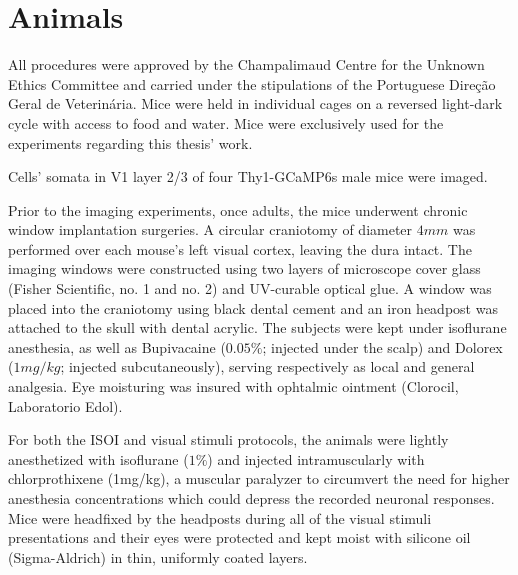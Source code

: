 \section{Animals}
\label{sec:Animals}

All procedures were approved by the Champalimaud Centre for the Unknown Ethics Committee and carried under the stipulations of the Portuguese Direção Geral de Veterinária. Mice were held in individual cages on a reversed light-dark cycle with access to food and water. Mice were exclusively used for the experiments regarding this thesis' work.

Cells' somata in V1 layer 2/3 of four Thy1-GCaMP6s male mice were imaged.

Prior to the imaging experiments, once adults, the mice underwent chronic window implantation surgeries. A circular craniotomy of diameter $4mm$ was performed over each mouse's left visual cortex, leaving the dura intact. The imaging windows were constructed using two layers of microscope cover glass (Fisher Scientific, no. 1 and no. 2) and UV-curable optical glue. A window was placed into the craniotomy using black dental cement and an iron headpost was attached to the skull with dental acrylic. The subjects were kept under isoflurane anesthesia, as well as Bupivacaine ($0.05\%$; injected under the scalp) and Dolorex ($1 mg/kg$; injected subcutaneously), serving respectively as local and general analgesia. Eye moisturing was insured with ophtalmic ointment (Clorocil, Laboratorio Edol).

For both the ISOI and visual stimuli protocols, the animals were lightly anesthetized with isoflurane ($1\%$) and injected intramuscularly with chlorprothixene (1mg/kg), a muscular paralyzer to circumvert the need for higher anesthesia concentrations which could depress the recorded neuronal responses. Mice were headfixed by the headposts during all of the visual stimuli presentations and their eyes were protected and kept moist with silicone oil (Sigma-Aldrich) in thin, uniformly coated layers.
